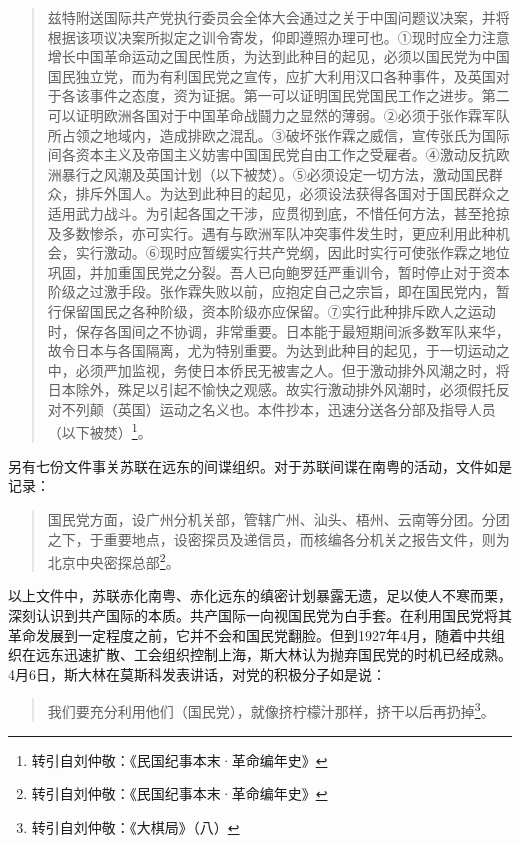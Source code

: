 \begin{quote}
兹特附送国际共产党执行委员会全体大会通过之关于中国问题议决案，并将根据该项议决案所拟定之训令寄发，仰即遵照办理可也。①现时应全力注意增长中国革命运动之国民性质，为达到此种目的起见，必须以国民党为中国国民独立党，而为有利国民党之宣传，应扩大利用汉口各种事件，及英国对于各该事件之态度，资为证据。第一可以证明国民党国民工作之进步。第二可以证明欧洲各国对于中国革命战鬪力之显然的薄弱。②必须于张作霖军队所占领之地域内，造成排欧之混乱。③破坏张作霖之威信，宣传张氏为国际间各资本主义及帝国主义妨害中国国民党自由工作之受雇者。④激动反抗欧洲暴行之风潮及英国计划（以下被焚）。⑤必须设定一切方法，激动国民群众，排斥外国人。为达到此种目的起见，必须设法获得各国对于国民群众之适用武力战斗。为引起各国之干涉，应贯彻到底，不惜任何方法，甚至抢掠及多数惨杀，亦可实行。遇有与欧洲军队冲突事件发生时，更应利用此种机会，实行激动。⑥现时应暂缓实行共产党纲，因此时实行可使张作霖之地位巩固，并加重国民党之分裂。吾人已向鲍罗廷严重训令，暂时停止对于资本阶级之过激手段。张作霖失败以前，应抱定自己之宗旨，即在国民党内，暂行保留国民之各种阶级，资本阶级亦应保留。⑦实行此种排斥欧人之运动时，保存各国间之不协调，非常重要。日本能于最短期间派多数军队来华，故令日本与各国隔离，尤为特别重要。为达到此种目的起见，于一切运动之中，必须严加监视，务使日本侨民无被害之人。但于激动排外风潮之时，将日本除外，殊足以引起不愉快之观感。故实行激动排外风潮时，必须假托反对不列颠（英国）运动之名义也。本件抄本，迅速分送各分部及指导人员（以下被焚）\footnote{转引自刘仲敬：《民国纪事本末·革命编年史》}。
\end{quote}

另有七份文件事关苏联在远东的间谍组织。对于苏联间谍在南粤的活动，文件如是记录：


\begin{quote}

国民党方面，设广州分机关部，管辖广州、汕头、梧州、云南等分团。分团之下，于重要地点，设密探员及递信员，而核编各分机关之报告文件，则为北京中央密探总部\footnote{转引自刘仲敬：《民国纪事本末·革命编年史》}。
\end{quote}

以上文件中，苏联赤化南粤、赤化远东的缜密计划暴露无遗，足以使人不寒而栗，深刻认识到共产国际的本质。共产国际一向视国民党为白手套。在利用国民党将其革命发展到一定程度之前，它并不会和国民党翻脸。但到1927年4月，随着中共组织在远东迅速扩散、工会组织控制上海，斯大林认为抛弃国民党的时机已经成熟。4月6日，斯大林在莫斯科发表讲话，对党的积极分子如是说：


\begin{quote}

我们要充分利用他们（国民党），就像挤柠檬汁那样，挤干以后再扔掉\footnote{转引自刘仲敬：《大棋局》（八）}。
\end{quote}


